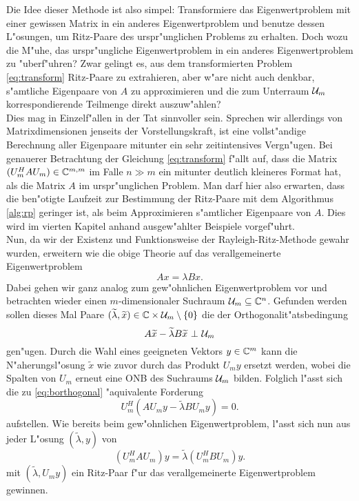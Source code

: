 Die Idee dieser Methode ist also simpel: Transformiere das Eigenwertproblem mit
einer gewissen Matrix in ein anderes Eigenwertproblem und benutze dessen L"osungen,
um Ritz-Paare des urspr"unglichen Problems zu erhalten.
Doch wozu die M"uhe, das urspr"ungliche Eigenwertproblem in ein anderes
Eigenwertproblem zu "uberf"uhren? Zwar gelingt es, aus dem transformierten Problem
\eqref{eq:transform} Ritz-Paare zu extrahieren, aber w"are nicht auch denkbar,
s"amtliche Eigenpaare von $A$ zu approximieren und die zum Unterraum $\mathcal{U}_m$
korrespondierende Teilmenge direkt auszuw"ahlen?\\

Dies mag in Einzelf"allen in der Tat sinnvoller sein. Sprechen wir allerdings
von Matrixdimensionen jenseits der Vorstellungskraft, ist eine vollst"andige
Berechnung aller Eigenpaare mitunter ein sehr zeitintensives Vergn"ugen. Bei
genauerer Betrachtung der Gleichung \eqref{eq:transform} f"allt auf, dass die
Matrix $(U_m^H A U_m) \in \mathbb{C}^{m,m}$ im Falle $n \gg m$ ein mitunter deutlich kleineres
Format hat, als die Matrix $A$ im urspr"unglichen Problem. Man darf hier also erwarten,
dass die ben"otigte Laufzeit zur Bestimmung der Ritz-Paare mit dem Algorithmus \ref{alg:rp}
geringer ist, als beim Approximieren s"amtlicher Eigenpaare von $A$. Dies
wird im vierten Kapitel anhand ausgew"ahlter Beispiele vorgef"uhrt.\\

Nun, da wir der Existenz und Funktionsweise der Rayleigh-Ritz-Methode gewahr wurden, erweitern wie die obige Theorie auf das
verallgemeinerte Eigenwertproblem
\begin{equation}\label{chap2:gevp}
Ax = \lambda Bx.
\end{equation}
Dabei gehen wir ganz analog zum gew"ohnlichen Eigenwertproblem vor und betrachten wieder
einen $m$-dimensionaler Suchraum $\mathcal{U}_m\subseteq \mathbb{C}^n$.
Gefunden werden sollen dieses Mal Paare $ (\widetilde{\lambda}, \widetilde{x}) \in \mathbb{C}
\times \mathcal{U}_m \setminus\{ 0\}$ die der Orthogonalit"atsbedingung
\begin{equation}\label{eq:borthogonal}
A\widetilde{x} - \widetilde{\lambda}B\widetilde{x} \ \bot \ \U_m
\end{equation}
gen"ugen. Durch die Wahl eines geeigneten Vektors $y\in\mathbb{C}^m$ kann die N"aherungsl"osung $\widetilde{x}$ wie zuvor durch das Produkt $U_m y$ ersetzt werden, wobei die Spalten von $U_m$ erneut eine ONB des Suchraums $\mathcal{U}_m$ bilden. Folglich l"asst sich die zu \eqref{eq:borthogonal} "aquivalente Forderung
\[
U_m^H(AU_m y - \widetilde{\lambda} BU_m y) = 0.
\]
aufstellen. Wie bereits beim gew"ohnlichen Eigenwertproblem, l"asst sich nun aus jeder L"osung
$(\widetilde{\lambda}, y)$ von
\begin{equation}\label{eq:transformedevp}
(U_m^H AU_m) y = \widetilde{\lambda} (U_m^H B U_m) y.
\end{equation}
mit $(\widetilde{\lambda}, U_m y)$ ein Ritz-Paar f"ur das verallgemeinerte Eigenwertproblem
gewinnen.\\

